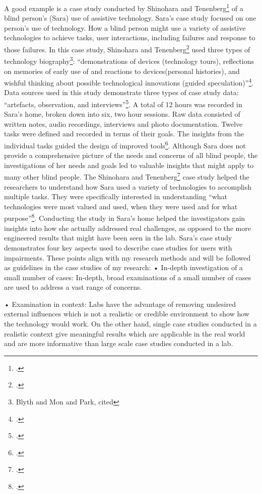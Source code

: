 A good example is a case study conducted by Shinohara and Tenenberg\footcite{Shinohara2009} of a blind person’s (Sara) use of assistive technology. Sara’s case study focused on one person’s use of technology. How a blind person might use a variety of assistive technologies to achieve tasks, user interactions, including failures and response to those failures.
In this case study, Shinohara and Tenenberg\footcite{Shinohara2009} used three types of technology biography\footnote{Blyth and Mon and Park, cited\cite{Cox2008}}: “demonstrations of devices (technology tours), reflections on memories of early use of and reactions to devices(personal histories), and wishful thinking about possible technological innovations (guided speculation)”\footcite{Shinohara2009}. Data sources used in this study demonstrate three types of case study data: “artefacts, observation, and interviews”\footcite{Shinohara2009}.
A total of 12 hours was recorded in Sara’s home, broken down into six, two hour sessions.  Raw data consisted of written notes, audio recordings, interviews and photo documentation.  Twelve tasks were defined and recorded in terms of their goals.  The insights from the individual tasks guided the design of improved tools\footcite{Shinohara2009}.
Although Sara does not provide a comprehensive picture of the needs and concerns of all blind people, the investigations of her needs and goals led to valuable insights that might apply to many other blind people.  The Shinohara and Tenenberg\footcite{Shinohara2009} case study helped the researchers to understand how Sara used a variety of technologies to accomplish multiple tasks.  They were specifically interested in understanding “what technologies were most valued and used, when they were used and for what purpose”\footcite{Shinohara2009}. Conducting the study in Sara’s home helped the investigators gain insights into how she actually addressed real challenges, as opposed to the more engineered results that might have been seen in the lab.  
Sara’s case study demonstrates four key aspects used to describe case studies for users with impairments.  These points align with my research methods and will be followed as guidelines in the case studies of my research:
•	In-depth investigation of a small number of cases: In-depth, broad examinations of a small number of cases are used to address a vast range of concerns.  

•	Examination in context: Labs have the advantage of removing undesired external influences which is not a realistic or credible environment to show how the technology would work. On the other hand, single case studies conducted in a realistic context give meaningful results which are applicable in the real world and are more informative than large scale case studies conducted in a lab.

